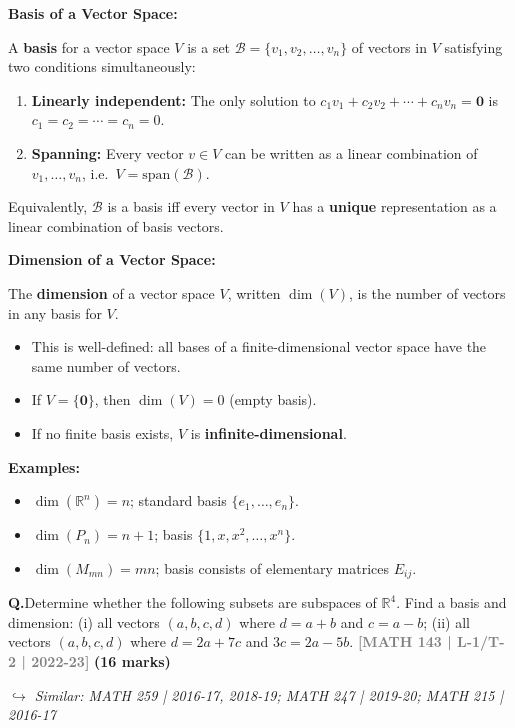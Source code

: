 \documentclass[12pt,a3paper]{article}
\newcommand{\yr}[1]{\hfill\textcolor{gray}{\small\textbf{[#1]}}}
\newcommand{\mk}[1]{\textcolor{orange!70!black}{\small\textbf{(#1 marks)}}}
\newcommand{\variant}[1]{\par\vspace{1pt}\textcolor{blue!50!black}%
  {\footnotesize\textit{$\hookrightarrow$ Similar: #1}}}
\newcounter{qnum}
\newcommand{\Q}[1]{%
  \needspace{4\baselineskip}
  \refstepcounter{qnum}
  \vspace{6pt}
  \noindent\textbf{Q\theqnum.}\enspace #1\par
}
\begin{document}
\begin{tcolorbox}[enhanced,breakable,colback=cC!4,colframe=cC,
  boxrule=0.8pt,arc=5pt,
  title={\textbf{Answer}},
  fonttitle=\bfseries\color{white},colbacktitle=cC]

\textbf{Basis of a Vector Space:}

A \textbf{basis} for a vector space $V$ is a set $\mathcal{B}=\{v_1,v_2,\ldots,v_n\}$ of vectors in $V$ satisfying two conditions simultaneously:
\begin{enumerate}[label=(\roman*),itemsep=2pt]
  \item \textbf{Linearly independent:} The only solution to $c_1v_1+c_2v_2+\cdots+c_nv_n=\mathbf{0}$ is $c_1=c_2=\cdots=c_n=0$.
  \item \textbf{Spanning:} Every vector $v\in V$ can be written as a linear combination of $v_1,\ldots,v_n$, i.e.\ $V=\mathrm{span}(\mathcal{B})$.
\end{enumerate}

Equivalently, $\mathcal{B}$ is a basis iff every vector in $V$ has a \textbf{unique} representation as a linear combination of basis vectors.

\medskip
\textbf{Dimension of a Vector Space:}

The \textbf{dimension} of a vector space $V$, written $\dim(V)$, is the number of vectors in any basis for $V$.

\begin{itemize}[itemsep=2pt]
  \item This is well-defined: all bases of a finite-dimensional vector space have the same number of vectors.
  \item If $V=\{\mathbf{0}\}$, then $\dim(V)=0$ (empty basis).
  \item If no finite basis exists, $V$ is \textbf{infinite-dimensional}.
\end{itemize}

\textbf{Examples:}
\begin{itemize}[itemsep=2pt]
  \item $\dim(\mathbb{R}^n)=n$; standard basis $\{e_1,\ldots,e_n\}$.
  \item $\dim(P_n)=n+1$; basis $\{1,x,x^2,\ldots,x^n\}$.
  \item $\dim(M_{mn})=mn$; basis consists of elementary matrices $E_{ij}$.
\end{itemize}
\end{tcolorbox}

\Q{Determine whether the following subsets are subspaces of $\mathbb{R}^4$. Find a basis and dimension: (i) all vectors $(a,b,c,d)$ where $d = a+b$ and $c = a-b$; (ii) all vectors $(a,b,c,d)$ where $d = 2a+7c$ and $3c = 2a-5b$.
\yr{MATH 143 | L-1/T-2 | 2022-23} \mk{16}
\variant{MATH 259 | 2016-17, 2018-19; MATH 247 | 2019-20; MATH 215 | 2016-17}}
\end{document}
